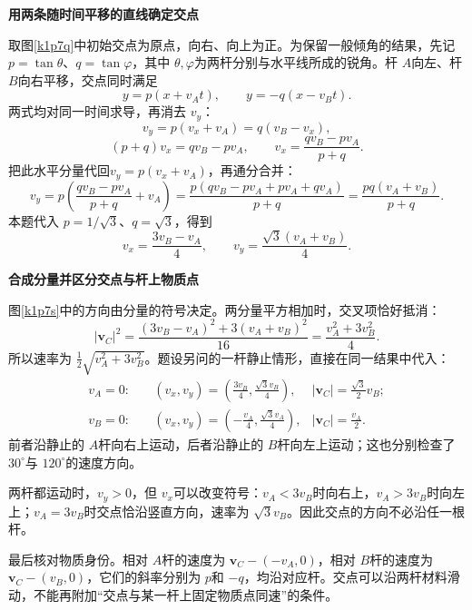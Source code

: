 \begin{solution}\textbf{用两条随时间平移的直线确定交点}\par\nobreak
取图\ref{k1p7q}中初始交点为原点，向右、向上为正。为保留一般倾角的结果，先记 $p=\tan\theta$、$q=\tan\varphi$，其中 $\theta,\varphi$为两杆分别与水平线所成的锐角。杆 $A$向左、杆 $B$向右平移，交点同时满足
\[y=p(x+v_At),\qquad y=-q(x-v_Bt).\]
两式均对同一时间求导，再消去 $v_y$：
\[v_y=p(v_x+v_A)=q(v_B-v_x),\]
\[
(p+q)v_x=qv_B-pv_A,\qquad
v_x=\frac{qv_B-pv_A}{p+q}.
\]
把此水平分量代回$v_y=p(v_x+v_A)$，再通分合并：
\[
v_y=p\left(\frac{qv_B-pv_A}{p+q}+v_A\right)
=\frac{p(qv_B-pv_A+pv_A+qv_A)}{p+q}
=\frac{pq(v_A+v_B)}{p+q}.
\]
本题代入 $p=1/\sqrt3$、$q=\sqrt3$，得到
\[\boxed{v_x=\frac{3v_B-v_A}{4}},\qquad
\boxed{v_y=\frac{\sqrt3(v_A+v_B)}4}.\]



\par\medskip{}\noindent\textbf{合成分量并区分交点与杆上物质点}\par\nobreak
图\ref{k1p7s}中的方向由分量的符号决定。两分量平方相加时，交叉项恰好抵消：
\[|\bm v_C|^2=\frac{(3v_B-v_A)^2+3(v_A+v_B)^2}{16}
 =\frac{v_A^2+3v_B^2}{4}.\]
所以速率为 $\tfrac12\sqrt{v_A^2+3v_B^2}$。题设另问的一杆静止情形，直接在同一结果中代入：
\begin{align*}
v_A=0:\quad &(v_x,v_y)=\left(\frac{3v_B}{4},\frac{\sqrt3v_B}{4}\right),
 &|\bm v_C|=\frac{\sqrt3}{2}v_B;\\
v_B=0:\quad &(v_x,v_y)=\left(-\frac{v_A}{4},\frac{\sqrt3v_A}{4}\right),
 &|\bm v_C|=\frac{v_A}{2}.
\end{align*}
前者沿静止的 $A$杆向右上运动，后者沿静止的 $B$杆向左上运动；这也分别检查了 $30^\circ$与 $120^\circ$的速度方向。

两杆都运动时，$v_y>0$，但 $v_x$可以改变符号：$v_A<3v_B$时向右上，$v_A>3v_B$时向左上；$v_A=3v_B$时交点恰沿竖直方向，速率为 $\sqrt3v_B$。因此交点的方向不必沿任一根杆。

最后核对物质身份。相对 $A$杆的速度为 $\bm v_C-(-v_A,0)$，相对 $B$杆的速度为 $\bm v_C-(v_B,0)$，它们的斜率分别为 $p$和 $-q$，均沿对应杆。交点可以沿两杆材料滑动，不能再附加“交点与某一杆上固定物质点同速”的条件。
\end{solution}

